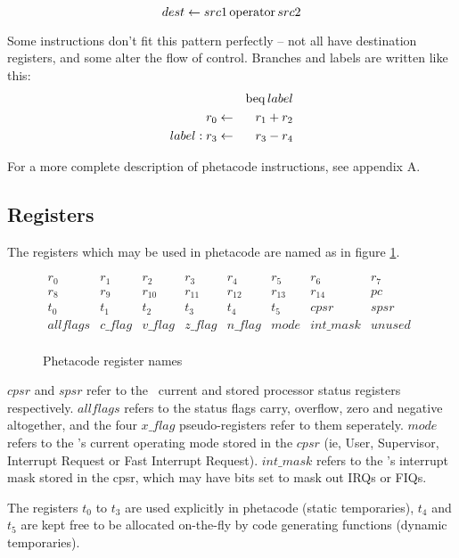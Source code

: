 \[dest \leftarrow src1 \mathop{\rm operator} src2\]

Some instructions don't fit this pattern perfectly -- not all have destination registers, and some alter the flow of control. Branches and labels are written like this:
\begin{eqnarray*}
 & & \mathop{\rm beq} label\\
r_0 & \leftarrow & r_1 + r_2\\
label: r_3 & \leftarrow & r_3 - r_4
\end{eqnarray*}

For a more complete description of phetacode instructions, see appendix A.

\subsection{Registers}

The registers which may be used in phetacode are named as in figure \ref{phetareg}.

\begin{figure}
{\centering \( \begin{array}{cccccccc}
r_{0} & r_{1} & r_{2} & r_{3} & r_{4} & r_{5} & r_{6} & r_{7}\\
r_{8} & r_{9} & r_{10} & r_{11} & r_{12} & r_{13} & r_{14} & pc\\
t_{0} & t_{1} & t_{2} & t_{3} & t_{4} & t_{5} & cpsr & spsr\\
allflags & c\_flag & v\_flag & z\_flag & n\_flag & mode & int\_mask & unused\\
\end{array} \)\par}
\caption{\label{phetareg}Phetacode register names}
\end{figure}

$cpsr$ and $spsr$ refer to the \arm\ current and stored processor status registers respectively. $allflags$ refers to the status flags carry, overflow, zero and negative altogether, and the four $x\_flag$ pseudo-registers refer to them seperately. $mode$ refers to the \arm's current operating mode stored in the $cpsr$ (ie, {\sc User}, {\sc Supervisor}, {\sc Interrupt Request} or {\sc Fast Interrupt Request}). $int\_mask$ refers to the \arm's interrupt mask stored in the cpsr, which may have bits set to mask out IRQs or FIQs.

The registers $t_0$ to $t_3$ are used explicitly in phetacode (static temporaries), $t_4$ and $t_5$ are kept free to be allocated on-the-fly by code generating functions (dynamic temporaries).

